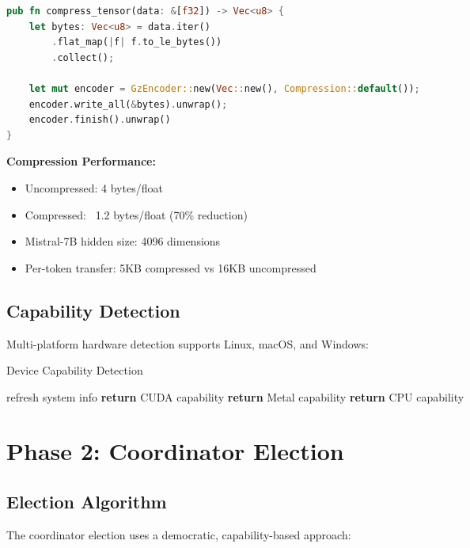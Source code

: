\documentclass[12pt,a4paper]{article}
\begin{document}
\begin{lstlisting}[language=Rust, caption=Tensor Compression]
pub fn compress_tensor(data: &[f32]) -> Vec<u8> {
    let bytes: Vec<u8> = data.iter()
        .flat_map(|f| f.to_le_bytes())
        .collect();

    let mut encoder = GzEncoder::new(Vec::new(), Compression::default());
    encoder.write_all(&bytes).unwrap();
    encoder.finish().unwrap()
}
\end{lstlisting}

\textbf{Compression Performance:}
\begin{itemize}
    \item Uncompressed: 4 bytes/float
    \item Compressed: ~1.2 bytes/float (70\% reduction)
    \item Mistral-7B hidden size: 4096 dimensions
    \item Per-token transfer: 5KB compressed vs 16KB uncompressed
\end{itemize}

\subsection{Capability Detection}

Multi-platform hardware detection supports Linux, macOS, and Windows:

\begin{algorithm}
\caption{Device Capability Detection}
\begin{algorithmic}[1]
    \State refresh system info
        \State \textbf{return} CUDA capability
        \State \textbf{return} Metal capability
    \Else
        \State \textbf{return} CPU capability
    \EndIf
\EndProcedure
\end{algorithmic}
\end{algorithm}

\section{Phase 2: Coordinator Election}

\subsection{Election Algorithm}

The coordinator election uses a democratic, capability-based approach:
\end{document}
